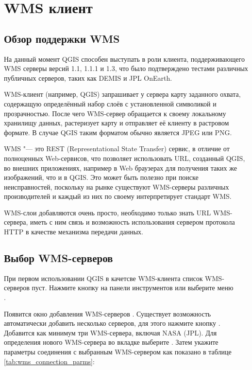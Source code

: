 \section{WMS
клиент}\label{sec:ogc-wms}

\subsection{Обзор поддержки
WMS}\label{sec:ogc-wms-about}

На данный момент QGIS способен выступать в роли клиента, поддерживающего WMS
серверы версий 1.1, 1.1.1 и 1.3, что было подтверждено тестами различных
публичных серверов, таких как DEMIS и JPL OnEarth.

WMS-клиент (например, QGIS) запрашивает у сервера карту заданного
охвата, содержащую определённый набор слоёв с установленной символикой и
прозрачностью. После чего WMS-сервер обращается к своему локальному хранилищу
данных, растеризует карту и отправляет её клиенту в растровом формате. В
случае QGIS таким форматом обычно является JPEG или PNG.

WMS "--- это REST (Representational State Transfer) сервис, в отличие от
полноценных Web-сервисов, что позволяет использовать URL, созданный QGIS,
во внешних приложениях, например в Web браузерах для получения таких же
изображений, что и в QGIS. Это может быть полезно при поиске неисправностей,
поскольку на рынке существуют WMS-серверы различных производителей и каждый
из них по своему интерпретирует стандарт WMS.

WMS-слои добавляются очень просто, необходимо только знать URL WMS-сервера,
иметь с ним связь и возможность использования сервером протокола HTTP в
качестве механизма передачи данных.

\subsection{Выбор WMS-серверов}\label{sec:ogc-wms-servers}

При первом использовании QGIS в качетсве WMS-клиента список WMS-серверов пуст.
Нажмите кнопку  на панели
инструментов или выберите меню  \arrow \\
.

Появится окно добавления WMS-серверов .
Существует возможность автоматически добавить несколько серверов, для
этого нажмите кнопку . Добавится как минимум три
WMS-сервера, включая NASA (JPL). Для определения нового WMS-сервера
во вкладке  выберите . Затем укажите
параметры соединения с выбранным WMS-сервером как показано в таблице
\ref{tab:wms_connection_parms}:

